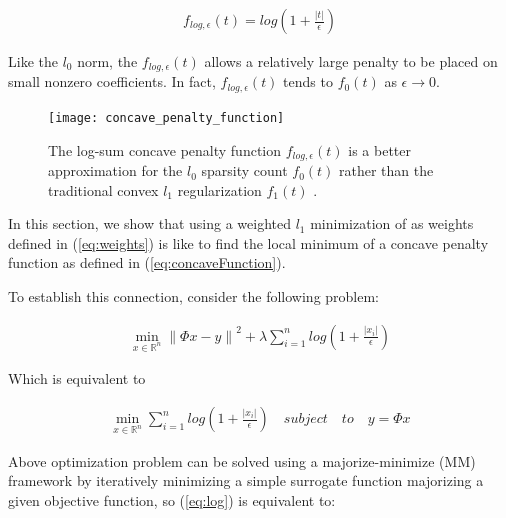 \begin{equation}
\label{eq:concaveFunction}
\begin{gathered}
f_{log,\epsilon}(t) = log(1+\frac{\left | t \right |}{\epsilon })
\end{gathered}
\end{equation}

Like the $l_0$ norm, the $f_{log,\epsilon}(t)$ allows a relatively large penalty to be placed on small nonzero coefficients. In fact, $f_{log,\epsilon}(t)$ tends to $f_0(t)$ as $\epsilon \rightarrow 0$.

\begin{figure}
\centering
\texttt{[image: concave\_penalty\_function]}\
\centering
\caption{The log-sum concave penalty function $f_{log,\epsilon}(t)$ is a better approximation for the $l_0$ sparsity count $f_0(t)$ rather than the traditional convex $l_1$ regularization $f_1(t)$ \cite{candes2008enhancing}.}
\label{concave_penalty_function}
\end{figure}

In this section, we show that using a weighted $l_{1}$ minimization of as weights defined in (\ref{eq:weights}) is like to find the local minimum of a concave penalty function as defined in (\ref{eq:concaveFunction}).

To establish this connection, consider the following problem:

\begin{equation}
\begin{gathered}
\min_{x\in \mathbb{R}^{n}}\left\|\Phi x-y\right\|^{2} + \lambda \sum_{i=1}^{n} log(1+\frac{\left | x_{i} \right |}{\epsilon })
\end{gathered}
\end{equation}

Which is equivalent to

\begin{equation}
\label{eq:log}
\begin{gathered}
\min_{x\in \mathbb{R}^{n}}
\sum_{i=1}^{n} log(1+\frac{\left | x_{i} \right |}{\epsilon })
\quad subject \quad to \quad y=\Phi x
\end{gathered}
\end{equation}

Above optimization problem can be solved using a majorize-minimize (MM) \cite{hunter2004} framework by iteratively minimizing a simple surrogate function majorizing a given objective function, so (\ref{eq:log}) is equivalent to:

